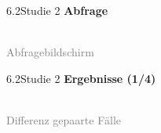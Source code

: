 \documentclass[xcolor=table,9pt,aspectratio=169]{beamer}
\begin{document}
\begin{frame}{\vspace*{10mm}6.2\hspace*{1em}Studie 2}
\textbf{Abfrage}\\
\medskip
\begin{center}
   \\
   \textcolor{gray}{Abfragebildschirm}
\end{center}
\end{frame}


\begin{frame}{\vspace*{10mm}6.2\hspace*{1em}Studie 2}
\textbf{Ergebnisse (1/4)}\\
\medskip
\begin{center}
   \\
   \textcolor{gray}{Differenz gepaarte Fälle}
\end{center}
\end{frame}
\end{document}
